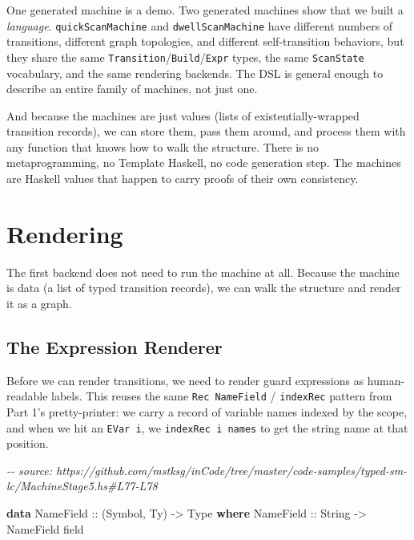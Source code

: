 \documentclass[]{article}
\newenvironment{Shaded}{}{}
\newcommand{\CommentTok}[1]{\textcolor[rgb]{0.38,0.63,0.69}{\textit{#1}}}
\newcommand{\DataTypeTok}[1]{\textcolor[rgb]{0.56,0.13,0.00}{#1}}
\newcommand{\KeywordTok}[1]{\textcolor[rgb]{0.00,0.44,0.13}{\textbf{#1}}}
\newcommand{\NormalTok}[1]{#1}
\newcommand{\OtherTok}[1]{\textcolor[rgb]{0.00,0.44,0.13}{#1}}
\begin{document}
One generated machine is a demo. Two generated machines show that we built a
\emph{language}. \texttt{quickScanMachine} and \texttt{dwellScanMachine} have
different numbers of transitions, different graph topologies, and different
self-transition behaviors, but they share the same
\texttt{Transition}/\texttt{Build}/\texttt{Expr} types, the same
\texttt{ScanState} vocabulary, and the same rendering backends. The DSL is
general enough to describe an entire family of machines, not just one.

And because the machines are just values (lists of existentially-wrapped
transition records), we can store them, pass them around, and process them with
any function that knows how to walk the structure. There is no metaprogramming,
no Template Haskell, no code generation step. The machines are Haskell values
that happen to carry proofs of their own consistency.

\section{Rendering}\label{rendering}

The first backend does not need to run the machine at all. Because the machine
is data (a list of typed transition records), we can walk the structure and
render it as a graph.

\subsection{The Expression Renderer}\label{the-expression-renderer}

Before we can render transitions, we need to render guard expressions as
human-readable labels. This reuses the same \texttt{Rec\ NameField} /
\texttt{indexRec} pattern from Part 1's pretty-printer: we carry a record of
variable names indexed by the scope, and when we hit an \texttt{EVar\ i}, we
\texttt{indexRec\ i\ names} to get the string name at that position.

\begin{Shaded}
\begin{Highlighting}[]
\CommentTok{{-}{-} source: https://github.com/mstksg/inCode/tree/master/code{-}samples/typed{-}sm{-}lc/MachineStage5.hs\#L77{-}L78}

\KeywordTok{data} \DataTypeTok{NameField}\OtherTok{ ::}\NormalTok{ (}\DataTypeTok{Symbol}\NormalTok{, }\DataTypeTok{Ty}\NormalTok{) }\OtherTok{{-}\textgreater{}} \DataTypeTok{Type} \KeywordTok{where}
  \DataTypeTok{NameField}\OtherTok{ ::} \DataTypeTok{String} \OtherTok{{-}\textgreater{}} \DataTypeTok{NameField}\NormalTok{ field}
\end{Highlighting}
\end{Shaded}
\end{document}
